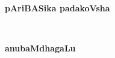 \documentclass[twoside,11pt,openany]{book}
\begin{document}

\vfill\eject
\phantom{a}~
\thispagestyle{empty}
\newpage

\mainmatter

\setlength{\columnseprule}{.5pt}

\newpage
~\phantom{a}
\thispagestyle{empty}
\vfill
\begin{center}
{\Huge\bf pAriBASika padakoVsha}
\end{center}
\vfill\eject

\newpage
~\phantom{a}
\thispagestyle{empty}
\vfill
\begin{center}
{\fontsize{30pt}{32pt}\selectfont\bf anubaMdhagaLu}
\bigskip
\bigskip

{\bf{}}
\end{center}
\vfill\eject

\end{document}
